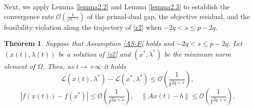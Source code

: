 \documentclass[review]{elsarticle}
\newtheorem{theorem}{Theorem}[section]
\begin{document}
Next, we apply Lemma  \ref{lemma2.2} and Lemma  \ref{lemma2.3} to establish the convergence rate   $\mathcal{O}\left(\frac{1}{t^{2q+s}}\right)$ of the primal-dual gap, the objective residual, and the feasibility violation along the trajectory of  \eqref{z2} when  $-2q<s\leq p-2q$. 
	
	\begin{theorem}\label{ztt3.2}
	Suppose that Assumption \ref{AS-F} holds and $-2q<s\leq p-2q$.
	Let $(x(t),\lambda(t))$ be a solution of \eqref{z2} and $(x^*,\lambda^*)$ be the minimum norm element of $\Omega$. Then, as $t\rightarrow+\infty$ it holds
	$$\mathcal{L}(x(t),\lambda^*)-\mathcal{L}(x^*,\lambda^*)\leq\mathcal{O}\left(\frac{1}{t^{2q+s}}\right),$$
	$$|f(x(t))-f(x^*)|\leq\mathcal{O}\left(\frac{1}{t^{2q+s}}\right), \quad \|Ax(t)-b\|\leq\mathcal{O}\left(\frac{1}{t^{2q+s}}\right).$$
   \end{theorem} 
\end{document}
